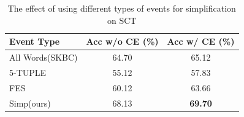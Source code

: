 \begin{table}[th!]
\small
\centering
\begin{tabular}{lcc}
\hline
\textbf{Event Type} & Acc w/o CE (\%) & Acc w/ CE (\%)\\
\hline \hline
All Words(SKBC)& 64.70 & 65.12\\
\hline
5-TUPLE&55.12 &57.83\\
FES&60.12 &63.66\\
Simp(ours)& 68.13 &{\bf 69.70} \\
\hline
\end{tabular}
\caption{The effect of using different types of events for simplification
on SCT}
\label{tab:sse}
\end{table}

\begin{table}[th!]
\small
\centering
{}
\caption{Effects of simplification using different types of
events on the length of the word sequence. 
Before = avg. num of words before simplify,
After = avg. num of words after simplify, Events = avg. num of events
extracted.}
\label{tab:size}
\end{table}



